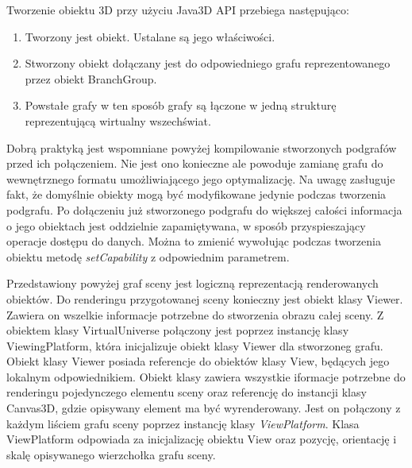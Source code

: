 Tworzenie obiektu 3D przy użyciu Java3D API przebiega następująco:
\begin{enumerate}
\item Tworzony jest obiekt. Ustalane są jego właściwości.
\item Stworzony obiekt dołączany jest do odpowiedniego grafu reprezentowanego przez obiekt BranchGroup.
\item Powstałe grafy w ten sposób grafy są łączone w jedną strukturę reprezentującą wirtualny wszechświat.
\end{enumerate}
Dobrą praktyką jest wspomniane powyżej kompilowanie stworzonych podgrafów przed ich połączeniem. Nie jest ono konieczne ale powoduje  zamianę grafu do wewnętrznego formatu umożliwiającego jego optymalizację. Na uwagę zasługuje fakt, że domyślnie obiekty mogą być modyfikowane jedynie podczas tworzenia podgrafu. Po dołączeniu już stworzonego podgrafu do większej całości informacja o jego obiektach jest oddzielnie zapamiętywana, w sposób przyspieszający operacje dostępu do danych. Można to zmienić wywołując podczas tworzenia obiektu metodę \textit{setCapability} z odpowiednim parametrem.

Przedstawiony powyżej graf sceny jest logiczną reprezentacją renderowanych obiektów.
Do renderingu przygotowanej sceny konieczny jest obiekt klasy Viewer.
Zawiera on wszelkie informacje potrzebne do stworzenia obrazu całej sceny. Z obiektem klasy VirtualUniverse połączony jest
poprzez instancję klasy ViewingPlatform, która inicjalizuje obiekt klasy Viewer dla stworzoneg grafu.
Obiekt klasy Viewer posiada referencje do obiektów klasy View, będących jego lokalnym odpowiednikiem.
Obiekt klasy  zawiera wszystkie iformacje potrzebne do renderingu pojedynczego elementu sceny oraz referencję do instancji klasy Canvas3D, gdzie opisywany element ma być wyrenderowany.
Jest on połączony z każdym liściem grafu sceny poprzez instancję klasy \textit {ViewPlatform}.
Klasa ViewPlatform odpowiada za inicjalizację obiektu View oraz pozycję, orientację i skalę opisywanego wierzchołka grafu sceny.

